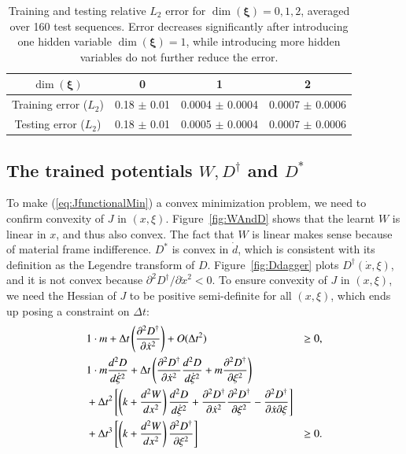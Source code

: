 \begin{table}[htbp]
    \centering
    \begin{tabular}{cccc}
        \hline
        $\dim(\bm{\xi})$ & 0 & 1 & 2 \\
        \hline
        Training error ($L_2$) & 0.18 $\pm$ 0.01 & 0.0004 $\pm$ 0.0004 & 0.0007 $\pm$ 0.0006\\
        Testing error ($L_2$) & 0.18 $\pm$ 0.01 & 0.0005 $\pm$ 0.0004 & 0.0007 $\pm$ 0.0006 \\
        \hline
    \end{tabular}
    \caption{Training and testing relative $L_2$ error for $\dim(\bm{\xi}) = 0, 1, 2$, 
    averaged over 160 test sequences. 
    Error decreases significantly after introducing one hidden variable $\dim(\bm{\xi}) = 1$, 
    while introducing more hidden variables do not further reduce the error. }
    \label{tab:dimXi}
\end{table}

\subsection{The trained potentials $W, D^\dagger$ and $D^*$}
To make (\ref{eq:JfunctionalMin}) a convex minimization problem, 
we need to confirm convexity of $J$ in $(x, \xi)$. 
Figure~\ref{fig:WAndD} shows that the learnt $W$ is linear in $x$, 
and thus also convex. 
The fact that $W$ is linear makes sense because of material frame indifference.   
$D^*$ is convex in $\dot{d}$, 
which is consistent with its definition as the Legendre transform of $D$. 
Figure~\ref{fig:Ddagger} plots $D^\dagger(\dot{x}, \xi)$, 
and it is not convex because $\partial^2 D^\dagger / \partial \dot{x}^2 < 0$. 
To ensure convexity of $J$ in $(x, \xi)$, 
we need the Hessian of $J$ to be positive semi-definite for all $(x, \xi)$, 
which ends up posing a constraint on $\Delta t$: 
\begin{align}
    &1 \cdot m + \Delta t \left(\frac{\partial^2 D^\dagger}{\partial \dot{x}^2}\right) + O(\Delta t^2)  &\ge 0, \label{eq:PSD1}\\
    & 1 \cdot m \frac{d^2D}{d\dot{\xi}^2} 
    + \Delta t \left(\frac{\partial^2 D^\dagger}{\partial \dot{x}^2} \frac{d^2D}{d\dot{\xi}^2} + m \frac{\partial^2 D^\dagger}{\partial \xi^2}\right) 
    &\notag \\
    & + \Delta t^2 \left[\left(k + \frac{d^2W}{dx^2}\right)\frac{d^2D}{d\dot{\xi}^2} + \frac{\partial^2 D^\dagger}{\partial \dot{x}^2}\frac{\partial^2 D^\dagger}{\partial \xi^2}-\frac{\partial^2D^\dagger}{\partial \dot{x} \partial \xi}\right] 
    &\notag \\
    & + \Delta t^3 \left[\left(k + \frac{d^2W}{dx^2}\right)\frac{\partial^2D^\dagger}{\partial \xi^2}\right] & \ge 0. \label{eq:PSD2}
\end{align}

